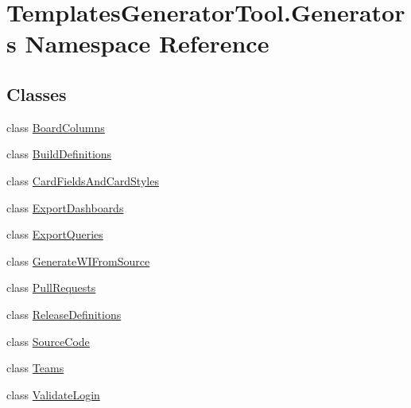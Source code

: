 \hypertarget{namespace_templates_generator_tool_1_1_generators}{}\section{Templates\+Generator\+Tool.\+Generators Namespace Reference}
\label{namespace_templates_generator_tool_1_1_generators}
\subsection*{Classes}
\begin{DoxyCompactItemize}
\item 
class \mbox{\hyperlink{class_templates_generator_tool_1_1_generators_1_1_board_columns}{Board\+Columns}}
\item 
class \mbox{\hyperlink{class_templates_generator_tool_1_1_generators_1_1_build_definitions}{Build\+Definitions}}
\item 
class \mbox{\hyperlink{class_templates_generator_tool_1_1_generators_1_1_card_fields_and_card_styles}{Card\+Fields\+And\+Card\+Styles}}
\item 
class \mbox{\hyperlink{class_templates_generator_tool_1_1_generators_1_1_export_dashboards}{Export\+Dashboards}}
\item 
class \mbox{\hyperlink{class_templates_generator_tool_1_1_generators_1_1_export_queries}{Export\+Queries}}
\item 
class \mbox{\hyperlink{class_templates_generator_tool_1_1_generators_1_1_generate_w_i_from_source}{Generate\+W\+I\+From\+Source}}
\item 
class \mbox{\hyperlink{class_templates_generator_tool_1_1_generators_1_1_pull_requests}{Pull\+Requests}}
\item 
class \mbox{\hyperlink{class_templates_generator_tool_1_1_generators_1_1_release_definitions}{Release\+Definitions}}
\item 
class \mbox{\hyperlink{class_templates_generator_tool_1_1_generators_1_1_source_code}{Source\+Code}}
\item 
class \mbox{\hyperlink{class_templates_generator_tool_1_1_generators_1_1_teams}{Teams}}
\item 
class \mbox{\hyperlink{class_templates_generator_tool_1_1_generators_1_1_validate_login}{Validate\+Login}}
\end{DoxyCompactItemize}
